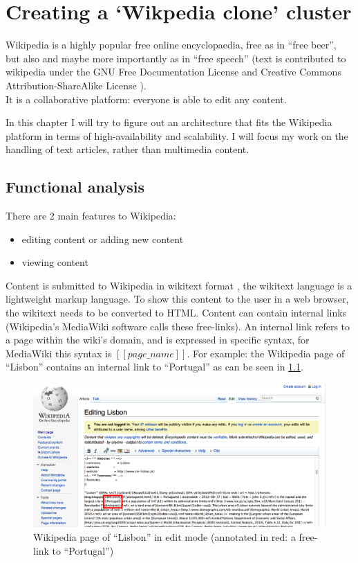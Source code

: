 \documentclass[12pt]{report}
\begin{document}
\chapter{Creating a `Wikpedia clone' cluster}
Wikipedia is a highly popular free online encyclopaedia, free 
as in ``free beer'', but also and maybe more importantly as in ``free
speech'' (text is contributed to wikipedia under the GNU Free
Documentation License \cite{gnu_free_doc_license} and Creative Commons
Attribution-ShareAlike License \cite{cca_license}).\\ It is a
collaborative platform: everyone is able to edit any content.

In this chapter I will try to figure out an architecture that fits the
Wikipedia platform in terms of high-availability and scalability.
I will focus my work on the handling of text articles, rather than
multimedia content.

\section{Functional analysis}
There are 2 main features to Wikipedia:
\begin{itemize}
\item editing content or adding new content
\item viewing content
\end{itemize}
Content is submitted to Wikipedia in wikitext
format \cite{wikitext}, the wikitext language is a lightweight markup
language. To show this content to the user in a web browser, 
the wikitext needs to be converted to HTML.
Content can contain internal links (Wikipedia's MediaWiki software
calls these free-links). An internal link refers to a page within
the wiki's domain, and is expressed in specific syntax, for MediaWiki
this syntax is $[[page\_name]]$. For example: the Wikipedia page of ``Lisbon''
contains an internal link to ``Portugal'' as can be seen in
\cref{fig:lisbon_wikipedia}.

\begin{figure}[h!]
  \caption{Wikipedia page of ``Lisbon'' in edit mode (annotated in
    red: a free-link to ``Portugal'')}
  \label{fig:lisbon_wikipedia}
  \centering
    \includegraphics[scale=0.2]{pics/wikipedia_lisbon.png}
\end{figure}
\end{document}
